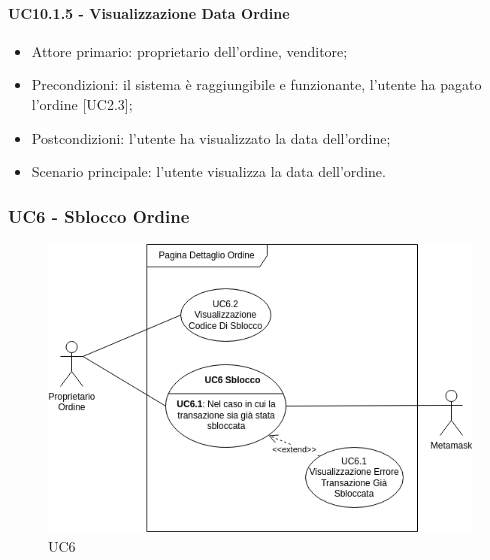 \paragraph{UC10.1.5 - Visualizzazione Data Ordine}

\begin{itemize}
    \item Attore primario: proprietario dell'ordine, venditore;
    \item Precondizioni: il sistema è raggiungibile e funzionante, l'utente ha pagato l'ordine [UC2.3];
    \item Postcondizioni: l'utente ha visualizzato la data dell'ordine;
    \item Scenario principale: l'utente visualizza la data dell'ordine.
\end{itemize}

\subsubsection{UC6 - Sblocco Ordine}

\begin{figure}[H]
    \centering
    \includegraphics[scale=0.7]{immagini/UC6.png}
    \caption{UC6}
\end{figure}

